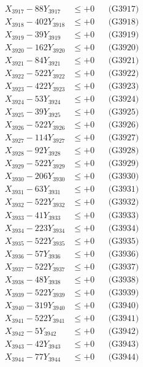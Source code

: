 \documentclass[a4paper,10pt]{article}
\begin{document}
{\begin{align}
X_{3917} - 88Y_{3917} &\leq +0 && \text{(G3917)} \\
X_{3918} - 402Y_{3918} &\leq +0 && \text{(G3918)} \\
X_{3919} - 39Y_{3919} &\leq +0 && \text{(G3919)} \\
X_{3920} - 162Y_{3920} &\leq +0 && \text{(G3920)} \\
\allowbreak
X_{3921} - 84Y_{3921} &\leq +0 && \text{(G3921)} \\
X_{3922} - 522Y_{3922} &\leq +0 && \text{(G3922)} \\
X_{3923} - 422Y_{3923} &\leq +0 && \text{(G3923)} \\
X_{3924} - 53Y_{3924} &\leq +0 && \text{(G3924)} \\
X_{3925} - 39Y_{3925} &\leq +0 && \text{(G3925)} \\
X_{3926} - 522Y_{3926} &\leq +0 && \text{(G3926)} \\
X_{3927} - 114Y_{3927} &\leq +0 && \text{(G3927)} \\
X_{3928} - 92Y_{3928} &\leq +0 && \text{(G3928)} \\
X_{3929} - 522Y_{3929} &\leq +0 && \text{(G3929)} \\
X_{3930} - 206Y_{3930} &\leq +0 && \text{(G3930)} \\
\allowbreak
X_{3931} - 63Y_{3931} &\leq +0 && \text{(G3931)} \\
X_{3932} - 522Y_{3932} &\leq +0 && \text{(G3932)} \\
X_{3933} - 41Y_{3933} &\leq +0 && \text{(G3933)} \\
X_{3934} - 223Y_{3934} &\leq +0 && \text{(G3934)} \\
X_{3935} - 522Y_{3935} &\leq +0 && \text{(G3935)} \\
X_{3936} - 57Y_{3936} &\leq +0 && \text{(G3936)} \\
X_{3937} - 522Y_{3937} &\leq +0 && \text{(G3937)} \\
X_{3938} - 48Y_{3938} &\leq +0 && \text{(G3938)} \\
X_{3939} - 522Y_{3939} &\leq +0 && \text{(G3939)} \\
X_{3940} - 319Y_{3940} &\leq +0 && \text{(G3940)} \\
\allowbreak
X_{3941} - 522Y_{3941} &\leq +0 && \text{(G3941)} \\
X_{3942} - 5Y_{3942} &\leq +0 && \text{(G3942)} \\
X_{3943} - 42Y_{3943} &\leq +0 && \text{(G3943)} \\
X_{3944} - 77Y_{3944} &\leq +0 && \text{(G3944)} \\

\end{align}}
\end{document}
